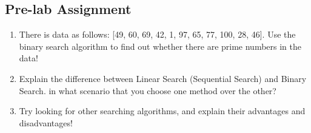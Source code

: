 \subsection{Pre-lab Assignment}
\begin{enumerate}
    \item There is data as follows: [49, 60, 69, 42, 1, 97, 65, 77, 100, 28, 46]. Use the binary search algorithm to find out whether there are prime numbers in the data!
    \item Explain the difference between Linear Search (Sequential Search) and Binary Search.
          in what scenario that you choose one method over the other?
    \item Try looking for other searching algorithms, and explain their advantages and disadvantages!
\end{enumerate}